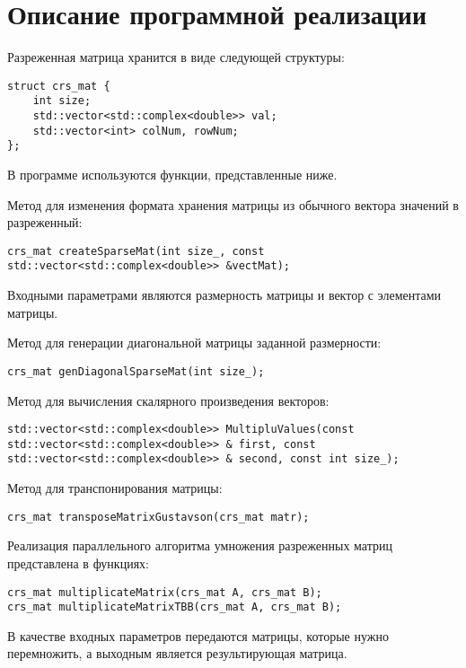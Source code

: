 \documentclass{report}
\begin{document}
\newpage

\section*{Описание программной реализации}
Разреженная матрица хранится в виде следующей структуры:

\begin{lstlisting}
struct crs_mat {
    int size;
    std::vector<std::complex<double>> val;
    std::vector<int> colNum, rowNum;
};
\end{lstlisting}
В программе используются функции, представленные ниже.
\par Метод для изменения формата хранения матрицы из обычного вектора значений в разреженный:
\begin{lstlisting}
crs_mat createSparseMat(int size_, const std::vector<std::complex<double>> &vectMat);
\end{lstlisting}
\par Входными параметрами являются размерность матрицы и вектор с элементами матрицы.
\par Метод для генерации диагональной матрицы заданной размерности:
\begin{lstlisting}
crs_mat genDiagonalSparseMat(int size_);
\end{lstlisting}
\par Метод для вычисления скалярного произведения векторов:
\begin{lstlisting}
std::vector<std::complex<double>> MultipluValues(const std::vector<std::complex<double>> & first, const std::vector<std::complex<double>> & second, const int size_);
\end{lstlisting}
\par Метод для транспонирования матрицы:
\begin{lstlisting}
crs_mat transposeMatrixGustavson(crs_mat matr);
\end{lstlisting}
\par Реализация параллельного алгоритма умножения разреженных матриц представлена в функциях:
\begin{lstlisting}
crs_mat multiplicateMatrix(crs_mat A, crs_mat B);
crs_mat multiplicateMatrixTBB(crs_mat A, crs_mat B);
\end{lstlisting}
\par В качестве входных параметров передаются матрицы, которые нужно перемножить, а выходным является результирующая матрица.
\newpage
\end{document}

